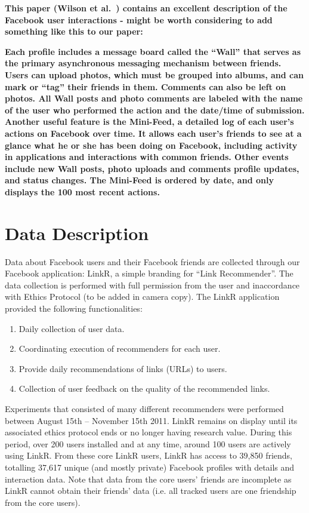 \documentclass[letterpaper]{article}
\begin{document}
\textbf{This paper (Wilson et al.~\cite{wilson2009user}) contains an excellent description of the Facebook user interactions - might be worth considering to add something like this to our paper:}


\textbf{Each profile includes a message board called the “Wall” that serves as the primary asynchronous messaging mechanism between friends. Users can upload photos, which must be grouped into albums, and can mark or “tag” their friends in them. Comments can also be left on photos. All Wall posts and photo comments are labeled with the name of the user who performed the action and the date/time of submission. Another useful feature is the Mini-Feed, a detailed log of each user’s actions on Facebook over time. It allows each user’s friends to see at a glance what he or she has been doing on Facebook, including activity in applications and interactions with common friends. Other events include new Wall posts, photo uploads and comments profile updates, and status changes. The Mini-Feed is ordered by date, and only displays the 100 most recent actions.}




\section{Data Description}


Data about Facebook users and their Facebook friends are collected through our Facebook application: LinkR, a simple branding for ``Link Recommender''. The data collection is performed with full permission from the user and inaccordance with Ethics Protocol (to be added in camera copy). The LinkR application provided the following functionalities:
\begin{enumerate}
\item Daily collection of user data.
\item Coordinating execution of recommenders for each user.
\item Provide daily recommendations of links (URLs) to users.
\item Collection of user feedback on the quality of the recommended links.
\end{enumerate}
Experiments that consisted of many different recommenders were performed between August 15th -- November 15th 2011. LinkR remains on display until its associated ethics protocol ends or no longer having research value. During this period, over 200 users installed and at any time, around 100 users are actively using LinkR. From these core LinkR users, LinkR has access to 39,850 friends, totalling 37,617 unique (and mostly private) Facebook profiles with details and interaction data. Note that data from the core users' friends are incomplete as LinkR cannot obtain their friends' data (i.e. all tracked users are one friendship from the core users).
\end{document}
